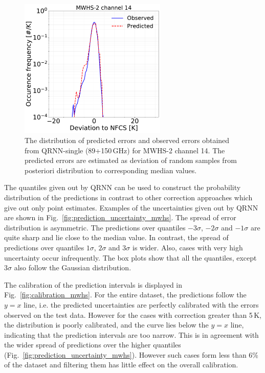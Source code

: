 \documentclass[amt, manuscript]{copernicus}
\begin{document}
\begin{figure}[t]
	\includegraphics[width=70mm]{Figures/deviation_posterior_mwhs_samples_14.pdf}	
	\caption{The distribution of predicted errors and observed errors  obtained from QRNN-single (89+150\,GHz) for MWHS-2 channel 14. The predicted errors are estimated as deviation of random samples from posteriori distribution to corresponding median values.}
	\label{fig:predicted_errors_mwhs}	
\end{figure}

The quantiles given out by QRNN can be used to construct the probability distribution of the predictions in contrast to other correction approaches which give out only point estimates. Examples of the uncertainties given out by QRNN are shown in Fig.~\ref{fig:prediction_uncertainty_mwhs}. The spread of error distribution is asymmetric. The predictions over quantiles $-3\sigma$, $-2\sigma$ and $-1\sigma$ are quite sharp and lie close to the median value. In contrast, the spread of predictions over quantiles $1\sigma$, $2\sigma$ and $3\sigma$ is wider. Also, cases with very high uncertainty occur infrequently. The box plots show that all the quantiles, except $3\sigma$ also follow the Gaussian distribution. 


The calibration of the prediction intervals is displayed in Fig.~\ref{fig:calibration_mwhs}. For the entire dataset, the predictions follow the $y=x$ line, i.e. the predicted uncertainties are perfectly calibrated with the errors observed on the test data. However for the cases with correction greater than 5\,K, the distribution is poorly calibrated, and the curve lies below the $y =x$ line, indicating that the prediction intervals are too narrow. This is in agreement with the wider spread of predictions over the  higher quantiles (Fig.~\ref{fig:prediction_uncertainty_mwhs}). However such cases form less than 6\% of the dataset and filtering them has little effect on the overall calibration.
\end{document}
